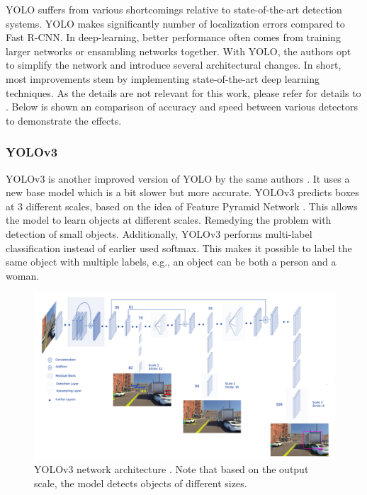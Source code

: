 YOLO suffers from various shortcomings relative to state-of-the-art detection systems. YOLO makes significantly number of localization errors compared to Fast R-CNN. In deep-learning, better performance often comes from training larger networks or ensambling networks together. With YOLO, the authors opt to simplify the network and introduce several architectural changes. In short, most improvements stem by implementing state-of-the-art deep learning techniques. As the details are not relevant for this work, please refer for details to \cite{Redmon2017}.  Below is shown an comparison of accuracy and speed between various detectors to demonstrate the effects.


\subsubsection{YOLOv3}
YOLOv3 is another improved version of YOLO by the same authors \cite{Redmon2018}. It uses a new base model which is a bit slower but more accurate. YOLOv3 predicts boxes at 3 different scales, based on the idea of Feature Pyramid Network \cite{Lin2017}. This allows the model to learn objects at different scales. Remedying the problem with detection of small objects. Additionally, YOLOv3 performs multi-label classification instead of earlier used softmax. This makes it possible to label the same object with multiple labels, e.g., an object can be both a person and a woman.


\begin{figure}[ht]
\begin{center}
\includegraphics[width=14cm,keepaspectratio]{images/2_literature/yolov3-architecture.png}
\end{center}
\caption{YOLOv3 network architecture \cite{Dulepet2020}. Note that based on the output scale, the model detects objects of different sizes.}
\end{figure}


